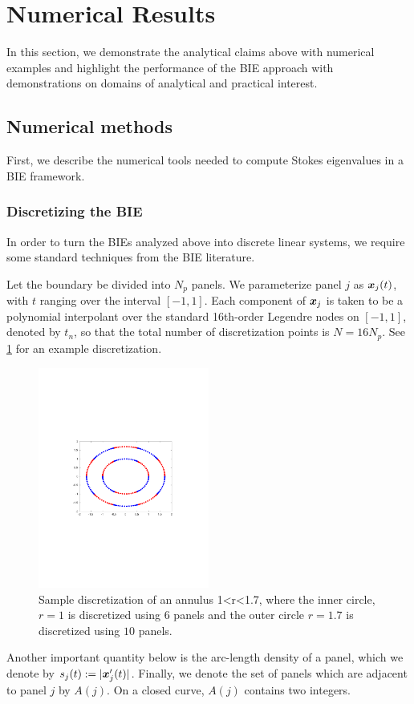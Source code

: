 \section{Numerical Results}
\label{sec:numerical}

In this section, we demonstrate the analytical
claims above with numerical examples and
highlight the performance of the BIE approach
with demonstrations on domains of analytical
and practical interest.

\subsection{Numerical methods}

First, we describe the numerical tools needed
to compute Stokes eigenvalues in a BIE
framework.

\subsubsection{Discretizing the BIE}

In order to turn the BIEs analyzed
above into discrete linear systems,
we require some standard techniques
from the BIE literature.

Let the boundary be divided into $N_p$
panels.
%
We parameterize panel $j$ as
${\boldsymbol x}_j(t)$, with $t$ ranging over the
interval $[-1,1]$.
%
Each component of ${\boldsymbol x}_j$ is taken to be
a polynomial interpolant over the
standard 16th-order Legendre nodes on
$[-1,1]$, denoted by $t_n$, so that
the total number of discretization
points is $N=16N_p$.
%
See \cref{fig:panels} for an example
discretization.

\begin{figure}
\centering
\includegraphics[width=0.5\textwidth]{media/annulus_discretization.pdf}
\caption{Sample discretization of an annulus 1<r<1.7, where the inner
circle, $r=1$ is discretized using $6$ panels and the outer circle $r=1.7$
is discretized using $10$ panels.}
\label{fig:panels}
\end{figure}
%
Another important quantity below is the
arc-length density of a panel, which
we denote by $s_j(t) := |{\boldsymbol x}'_j(t)|$.
%
Finally, we denote the set of panels
which are adjacent to panel $j$
by $A(j)$. On a closed curve,
$A(j)$ contains two integers.

